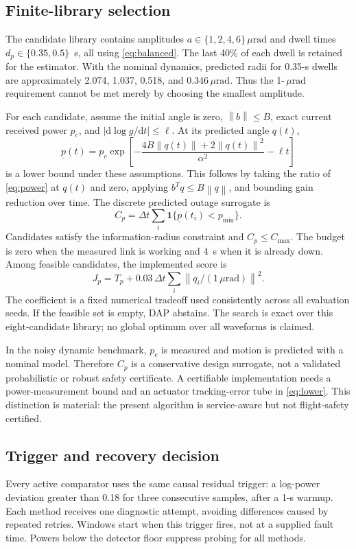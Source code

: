 \documentclass[journal]{IEEEtran}
\newcommand{\norm}[1]{\left\lVert#1\right\rVert}
\newcommand{\um}{\,\mu\mathrm{rad}}
\begin{document}
\subsection{Finite-library selection}
The candidate library contains amplitudes $a\in\{1,2,4,6\}\um$ and dwell times $d_p\in\{0.35,0.5\}$~s, all using \eqref{eq:balanced}. The last 40\% of each dwell is retained for the estimator. With the nominal dynamics, predicted radii for 0.35-s dwells are approximately 2.074, 1.037, 0.518, and $0.346\um$. Thus the 1-$\um$ requirement cannot be met merely by choosing the smallest amplitude.

For each candidate, assume the initial angle is zero, $\norm b\leq B$, exact current received power $p_c$, and $|\mathrm{d}\log g/\mathrm{d}t|\leq\ell$. At its predicted angle $q(t)$,
\begin{equation}
 \underline p(t)=p_c\exp\!\left[-\frac{4B\norm{q(t)}+2\norm{q(t)}^2}{\alpha^2}-\ell t\right]
 \label{eq:lower}
\end{equation}
is a lower bound under these assumptions. This follows by taking the ratio of \eqref{eq:power} at $q(t)$ and zero, applying $b^Tq\leq B\norm q$, and bounding gain reduction over time. The discrete predicted outage surrogate is
\begin{equation}
 C_p=\Delta t\sum_i\mathbf{1}\{\underline p(t_i)<p_{\min}\}.
\end{equation}
Candidates satisfy the information-radius constraint and $C_p\leq C_{\max}$. The budget is zero when the measured link is working and 4~s when it is already down. Among feasible candidates, the implemented score is
\begin{equation}
 J_p=T_p+0.03\,\Delta t\sum_i\norm{q_i/(1\um)}^2.
 \label{eq:score}
\end{equation}
The coefficient is a fixed numerical tradeoff used consistently across all evaluation seeds. If the feasible set is empty, DAP abstains. The search is exact over this eight-candidate library; no global optimum over all waveforms is claimed.

In the noisy dynamic benchmark, $p_c$ is measured and motion is predicted with a nominal model. Therefore $C_p$ is a conservative design surrogate, not a validated probabilistic or robust safety certificate. A certifiable implementation needs a power-measurement bound and an actuator tracking-error tube in \eqref{eq:lower}. This distinction is material: the present algorithm is service-aware but not flight-safety certified.

\subsection{Trigger and recovery decision}
Every active comparator uses the same causal residual trigger: a log-power deviation greater than 0.18 for three consecutive samples, after a 1-s warmup. Each method receives one diagnostic attempt, avoiding differences caused by repeated retries. Windows start when this trigger fires, not at a supplied fault time. Powers below the detector floor suppress probing for all methods.
\end{document}
